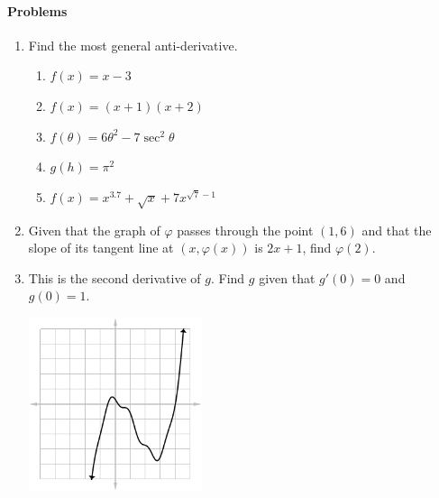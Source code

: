 \paragraph{Problems}
\begin{enumerate}
  \item Find the most general anti-derivative.
    \begin{enumerate}
      \item $ f(x) = x - 3 $
      \item $ f(x) = (x + 1)(x + 2) $
      \item $ f(\theta) = 6\theta^2 - 7 \sec^2 \theta $
      \item $ g(h) = \pi^2 $
      \item $ f(x) = x^{3.7} + \sqrt{x} + 7x^{\sqrt{7} - 1} $
    \end{enumerate}
  \item Given that the graph of $ \varphi $ passes through the point $ (1, 6) $
        and that the slope of its tangent line at $ (x, \varphi(x)) $ is $ 2x + 1 $,
        find $ \varphi(2) $.
  \item This is the second derivative of $ g $. Find $ g $ given that $ g'(0) = 0 $ and $ g(0) = 1 $.
        \begin{center}
          \includegraphics[width=0.4\textwidth]{anti7}
        \end{center}
\end{enumerate}
